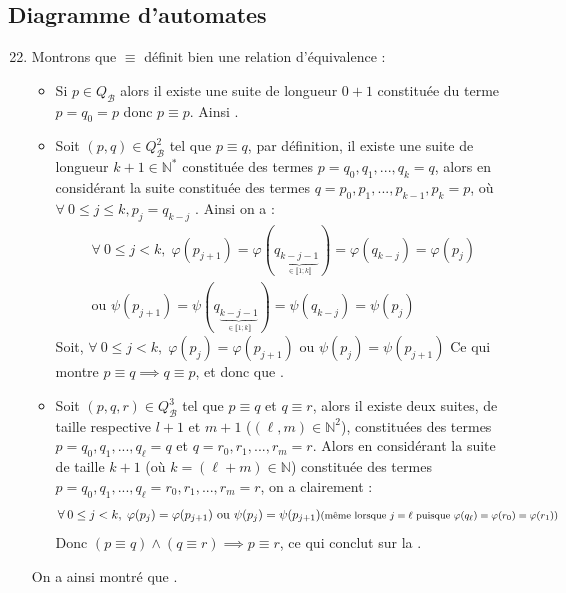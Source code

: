 \documentclass{article}
\newcommand{\bb}[1]{\mathbb{#1}}
\begin{document}
\subsection{Diagramme d'automates}

\begin{enumerate}
    \setcounter{enumi}{21}

    \item Montrons que $\equiv$ définit bien une relation d'équivalence :
        \begin{itemize}
            \item Si $p \in Q_\mathcal{B}$ alors il existe une suite de longueur $0 + 1$ constituée du terme $ p = q_0 = p $ donc $p \equiv p $. Ainsi .
            \item Soit $(p,q) \in Q_\mathcal{B}^2$ tel que $p \equiv q$, par définition, il existe une suite de longueur $k + 1 \in \bb{N^*}$ constituée des termes $p = q_0, q_1,..., q_k = q$, alors en considérant la suite constituée des termes $q = p_0, p_1, ..., p_{k - 1}, p_k = p$, où $ \forall \: 0 \leq j \leq k, p_j = q_{k - j}$ . Ainsi on a : \begin{multline*}
                \forall \: 0 \leq j < k, \; \varphi(p_{j + 1}) = \varphi(q_{\underbrace{k - j - 1}_{\in \llbracket 1 ; k \rrbracket}}) = \varphi(q_{k - j}) = \varphi(p_j) \\
                \text{ou   }  \psi(p_{j + 1}) = \psi(q_{\underbrace{k - j - 1}_{\in \llbracket 1 ; k \rrbracket}}) = \psi(q_{k - j}) = \psi(p_j)
            \end{multline*}
            Soit, $\forall \: 0 \leq j < k, \; \varphi(p_j) = \varphi(p_{j + 1}) \text{ ou } \psi(p_j) = \psi(p_{j + 1})$ \newline
            Ce qui montre $p \equiv q \implies q \equiv p$, et donc que .
            \item Soit $(p, q, r) \in Q_\mathcal{B}^3$ tel que $p \equiv q$ et $q \equiv r$, alors il existe deux suites, de taille respective $l + 1$ et $m + 1$ ($(\ell, m) \in \bb{N}^2$), constituées des termes $p = q_0, q_1, ... , q_\ell = q$ et $ q = r_0, r_1, ... , r_m = r$. \newline
            Alors en considérant la suite de taille $ k + 1 $ (où $ k = (\ell + m) \in \bb{N}$) constituée des termes \newline
            $p = q_0, q_1, ... , q_\ell = r_0, r_1, ... , r_m = r$, on a clairement :
            \begin{align*} \forall \: 0 \leq j < k, \; \varphi(p_j) = \varphi(p_{j + 1}) \text{ ou } \psi(p_j) = \psi(p_{j + 1}) \text{\footnotesize{(même lorsque $j = \ell$ puisque $\varphi(q_\ell) = \varphi(r_0) = \varphi(r_1)$)}} \end{align*}
            Donc $(p \equiv q) \land (q \equiv r) \implies p \equiv r$, ce qui conclut sur la .
        \end{itemize}
        On a ainsi montré que .


\end{enumerate}
\end{document}
